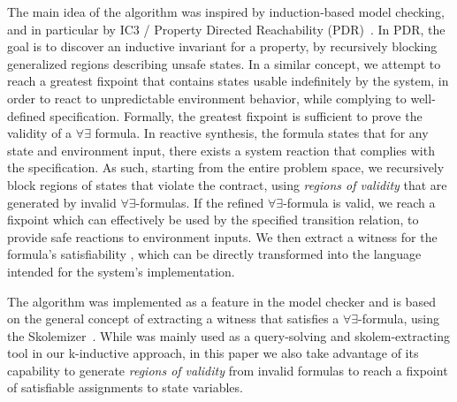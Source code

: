 The main idea of the algorithm was inspired by induction-based model checking, and in particular by IC3 / Property Directed Reachability (PDR)~\cite{bradley2011sat,een2011efficient}. In PDR, the goal is to discover an inductive invariant for a property, by recursively blocking generalized regions describing unsafe states. In a similar concept, we attempt
to reach a greatest fixpoint that contains states usable indefinitely by the
system, in order to react to unpredictable environment behavior, while
complying to well-defined specification. Formally, the greatest fixpoint is sufficient to prove the validity of a $\forall\exists$ formula. In reactive synthesis, the formula states that for any state and environment input, there exists a system reaction that complies with the specification. As such, starting from the entire
problem space, we recursively block regions of states that violate the contract, using \textit{regions of validity} that are
generated by invalid $\forall\exists$-formulas. 
If the refined
$\forall\exists$-formula is valid, we reach a fixpoint which can effectively be used by the specified transition relation, to
provide safe reactions to environment inputs. We then extract a witness for the
formula's satisfiability
, which can be directly transformed into the
language intended for the system's implementation.

The algorithm was implemented as a feature in the \jkind model checker and is based on the general
concept of extracting a witness that satisfies a $\forall\exists$-formula, using
the \aeval Skolemizer~\cite{fedyukovich2015automated,KatisFGBGW16}. While \aeval was mainly used as a query-solving and skolem-extracting tool in our k-inductive approach, in this paper we also take advantage of its capability to generate
\textit{regions of validity} from invalid formulas to reach a fixpoint of satisfiable assignments to state variables.

